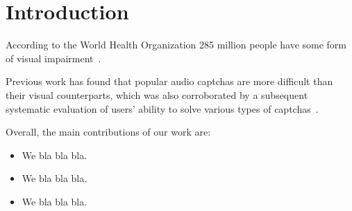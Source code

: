 \section{Introduction}
\label{sec:intro}

According to the World Health Organization 285 million people have some form of visual impairment~\cite{impaired}.

Previous work has found that popular audio captchas are more difficult than their visual counterparts,
which was also corroborated by a subsequent systematic evaluation of users' ability to solve various types of
captchas~\cite{captchas-are-hard}.





Overall, the main contributions of our work are:

\begin{itemize}

\item We bla bla bla.

\item We bla bla bla.

\item We bla bla bla.

\end{itemize}
